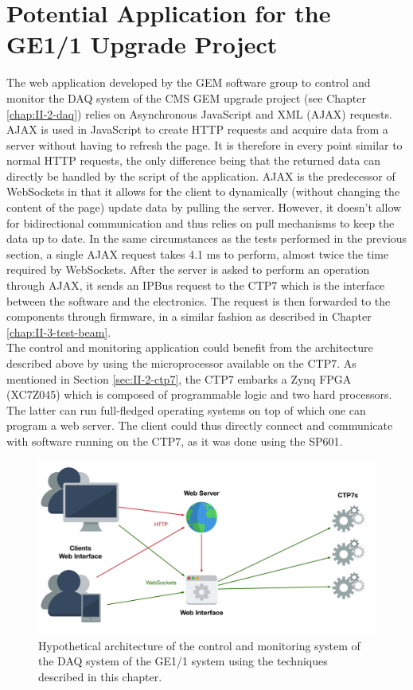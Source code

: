   \section{Potential Application for the GE1/1 Upgrade Project}

    The web application developed by the GEM software group to control and monitor the DAQ system of the CMS GEM upgrade project (see Chapter \ref{chap:II-2-daq}) relies on Asynchronous JavaScript and XML (AJAX) requests. AJAX is used in JavaScript to create HTTP requests and acquire data from a server without having to refresh the page. It is therefore in every point similar to normal HTTP requests, the only difference being that the returned data can directly be handled by the script of the application. AJAX is the predecessor of WebSockets in that it allows for the client to dynamically (without changing the content of the page) update data by pulling the server. However, it doesn't allow for bidirectional communication and thus relies on pull mechanisms to keep the data up to date. In the same circumstances as the tests performed in the previous section, a single AJAX request takes 4.1 ms to perform, almost twice the time required by WebSockets. After the server is asked to perform an operation through AJAX, it sends an IPBus request to the CTP7 which is the interface between the software and the electronics. The request is then forwarded to the components through firmware, in a similar fashion as described in Chapter \ref{chap:II-3-test-beam}. \\

    The control and monitoring application could benefit from the architecture described above by using the microprocessor available on the CTP7. As mentioned in Section \ref{sec:II-2-ctp7}, the CTP7 embarks a Zynq FPGA (XC7Z045) which is composed of programmable logic and two hard processors. The latter can run full-fledged operating systems on top of which one can program a web server. The client could thus directly connect and communicate with software running on the CTP7, as it was done using the SP601. \\

    \begin{figure}[b!]
      \centering
      \includegraphics[width=\textwidth]{img/III-2-web-daq/gem-sys}
      \caption{Hypothetical architecture of the control and monitoring system of the DAQ system of the GE1/1 system using the techniques described in this chapter.}
      \label{fig:III-2-gem}
    \end{figure}

